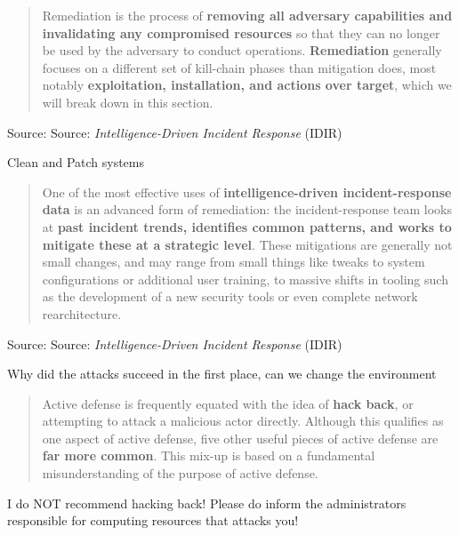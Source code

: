 \documentclass[Screen16to9,17pt]{foils}
\begin{document}

\begin{quote}
Remediation is the process of {\bf removing all adversary capabilities and invalidating any compromised resources} so that they can no longer be used by the adversary to conduct operations. {\bf Remediation} generally focuses on a different set of kill-chain phases
than mitigation does, most notably {\bf exploitation, installation, and actions over target}, which we will break down in this section.
\end{quote}
Source: Source: \emph{Intelligence-Driven Incident Response} (IDIR)

\begin{list2}
\item Clean and Patch systems
\end{list2}




\begin{quote}
One of the most effective uses of {\bf intelligence-driven incident-response data} is an
advanced form of remediation: the incident-response team looks at {\bf past incident
trends, identifies common patterns, and works to mitigate these at a strategic level}.
These mitigations are generally not small changes, and may range from small things
like tweaks to system configurations or additional user training, to massive shifts in
tooling such as the development of a new security tools or even complete network
rearchitecture.
\end{quote}
Source: Source: \emph{Intelligence-Driven Incident Response} (IDIR)

\begin{list2}
\item Why did the attacks succeed in the first place, can we change the environment
\end{list2}


\begin{quote}
Active defense is frequently equated with the idea of {\bf hack back}, or attempting to attack
a malicious actor directly. Although this qualifies as one aspect of active defense, five
other useful pieces of active defense are {\bf far more common}. This mix-up is based on a
fundamental misunderstanding of the purpose of active defense.
\end{quote}

I do NOT recommend hacking back! Please do inform the administrators responsible for computing resources that attacks you!
\end{document}
